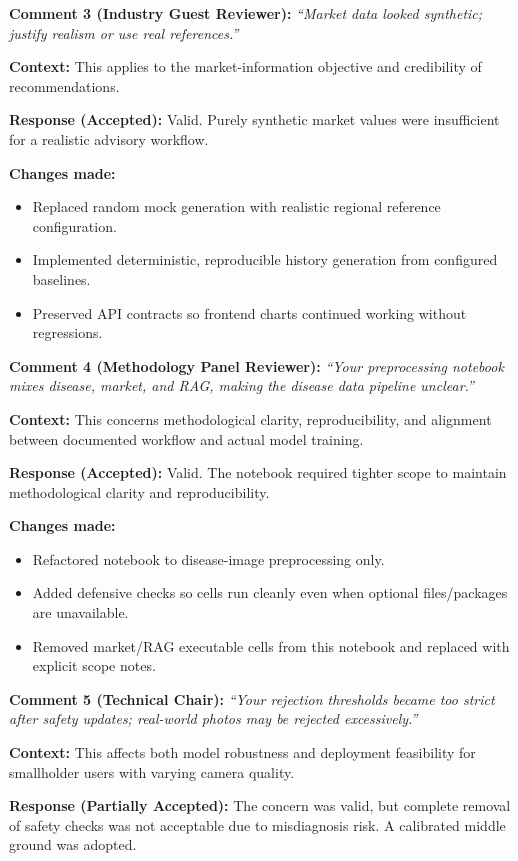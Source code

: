 \documentclass[10pt,a4paper]{article}
\begin{document}
\textbf{Comment 3 (Industry Guest Reviewer):} \emph{``Market data looked synthetic; justify realism or use real references.''}

\textbf{Context:} This applies to the market-information objective and credibility of recommendations.

\textbf{Response (Accepted):} Valid. Purely synthetic market values were insufficient for a realistic advisory workflow.

\textbf{Changes made:}
\begin{itemize}[noitemsep]
  \item Replaced random mock generation with realistic regional reference configuration.
  \item Implemented deterministic, reproducible history generation from configured baselines.
  \item Preserved API contracts so frontend charts continued working without regressions.
\end{itemize}

\textbf{Comment 4 (Methodology Panel Reviewer):} \emph{``Your preprocessing notebook mixes disease, market, and RAG, making the disease data pipeline unclear.''}

\textbf{Context:} This concerns methodological clarity, reproducibility, and alignment between documented workflow and actual model training.

\textbf{Response (Accepted):} Valid. The notebook required tighter scope to maintain methodological clarity and reproducibility.

\textbf{Changes made:}
\begin{itemize}[noitemsep]
  \item Refactored notebook to disease-image preprocessing only.
  \item Added defensive checks so cells run cleanly even when optional files/packages are unavailable.
  \item Removed market/RAG executable cells from this notebook and replaced with explicit scope notes.
\end{itemize}

\textbf{Comment 5 (Technical Chair):} \emph{``Your rejection thresholds became too strict after safety updates; real-world photos may be rejected excessively.''}

\textbf{Context:} This affects both model robustness and deployment feasibility for smallholder users with varying camera quality.

\textbf{Response (Partially Accepted):} The concern was valid, but complete removal of safety checks was not acceptable due to misdiagnosis risk. A calibrated middle ground was adopted.
\end{document}
